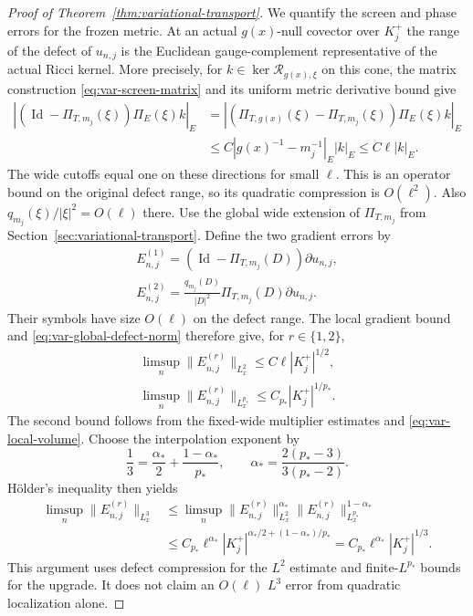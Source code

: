 \documentclass[11pt,a4paper]{article}
\numberwithin{equation}{section}
\newcommand{\Id}{\operatorname{Id}}
\newcommand{\f}[2]{\frac{#1}{#2}}
\theoremstyle{definition}
\begin{document}
\begin{proof}[Proof of Theorem~\ref{thm:variational-transport}]
We quantify the screen and phase errors for the frozen metric. At an
actual $g(x)$-null covector over $K_j^+$ the range of the defect of
$u_{n,j}$ is the Euclidean gauge-complement representative of the
actual Ricci kernel. More precisely, for
$k\in\ker\mathcal R_{g(x),\xi}$ on this cone, the matrix construction
\eqref{eq:var-screen-matrix} and its uniform metric derivative bound give
\begin{equation*}
\begin{split}
|(\Id-\Pi_{T,m_j}(\xi))\Pi_E(\xi)k|_E
&=|(\Pi_{T,g(x)}(\xi)-\Pi_{T,m_j}(\xi))\Pi_E(\xi)k|_E\\
&\leq C|g(x)^{-1}-m_j^{-1}|_E|k|_E
\leq C\ell|k|_E.
\end{split}
\end{equation*}
The wide cutoffs equal one on these directions for small $\ell$.
This is an operator bound on the original defect range, so its
quadratic compression is $O(\ell^2)$. Also
$q_{m_j}(\xi)/|\xi|^2=O(\ell)$ there. Use the global wide extension of $\Pi_{T,m_j}$ from
Section~\ref{sec:variational-transport}. Define the two gradient errors by
\begin{equation*}
\begin{gathered}
E_{n,j}^{(1)}=(\Id-\Pi_{T,m_j}(D))\partial u_{n,j},\\
E_{n,j}^{(2)}=\f{q_{m_j}(D)}{|D|^2}
                  \Pi_{T,m_j}(D)\partial u_{n,j}.
\end{gathered}
\end{equation*}
Their symbols have size $O(\ell)$ on the defect range. The local
gradient bound and \eqref{eq:var-global-defect-norm} therefore give,
for $r\in\{1,2\}$,
\begin{equation*}
\begin{gathered}
\limsup_n\|E_{n,j}^{(r)}\|_{L^2_x}
\leq C\ell|K_j^+|^{1/2},\\
\limsup_n\|E_{n,j}^{(r)}\|_{L^{p_*}_x}
\leq C_{p_*}|K_j^+|^{1/p_*}.
\end{gathered}
\end{equation*}
The second bound follows from the fixed-wide multiplier estimates and
\eqref{eq:var-local-volume}. Choose the interpolation exponent by
\begin{equation*}
\f13=\f{\alpha_*}{2}+\f{1-\alpha_*}{p_*},
\qquad \alpha_* = \f{2(p_*-3)}{3(p_*-2)}.
\end{equation*}
H\"older's inequality then yields
\begin{equation}\label{eq:var-projection-error}
\begin{aligned}
\limsup_n\|E_{n,j}^{(r)}\|_{L^3_x}
&\leq\limsup_n
 \|E_{n,j}^{(r)}\|_{L^2_x}^{\alpha_*}
 \|E_{n,j}^{(r)}\|_{L^{p_*}_x}^{1-\alpha_*}\\
&\leq C_{p_*}\ell^{\alpha_*}
 |K_j^+|^{\alpha_*/2+(1-\alpha_*)/p_*}
 =C_{p_*}\ell^{\alpha_*}|K_j^+|^{1/3}.
\end{aligned}
\end{equation}
This argument uses defect compression for the $L^2$ estimate and
finite-$L^{p_*}$ bounds for the upgrade. It does not claim an $O(\ell)$
$L^3$ error from quadratic localization alone.


\end{proof}
\end{document}
